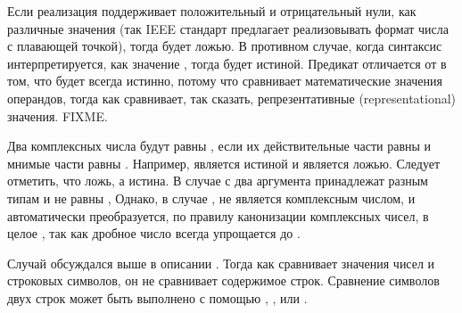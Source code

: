 \begin{defun}[Функция]
Если реализация поддерживает положительный и отрицательный нули, как различные
значения (так IEEE стандарт предлагает реализовывать формат числа с плавающей
точкой), тогда  будет ложью. В противном случае, когда
синтаксис  интерпретируется, как значение , тогда  будет истиной. Предикат \cdf{=} отличается от  в том, что
 будет всегда истинно, потому что \cdf{=} сравнивает
математические значения операндов, тогда как  сравнивает, так сказать,
репрезентативные (representational) значения. FIXME.

Два комплексных числа будут равны , если их действительные части равны
 и мнимые части равны .
Например,  является истиной и
 является ложью.
Следует отметить, что  ложь,
а  истина.
В случае с 
два аргумента принадлежат разным типам и не равны ,
Однако, в случае ,
 не является комплексным числом, и автоматически преобразуется, по
правилу канонизации комплексных чисел, в целое , так как дробное число
 всегда упрощается до .

Случай  обсуждался выше в описании . Тогда как
 сравнивает значения чисел и строковых символов, он не сравнивает
содержимое строк. Сравнение символов двух строк может быть выполнено с помощью
, ,  или .
\end{defun}

